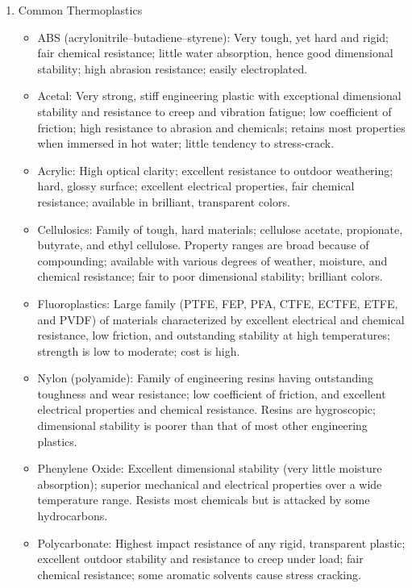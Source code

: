 \documentclass[a4paper,openany,12pt]{book}
\begin{document}
\begin{enumerate}
\item Common Thermoplastics
\label{common-thermoplastics}
\begin{itemize}
\item ABS (acrylonitrile--butadiene--styrene): Very tough, yet hard and
rigid; fair chemical resistance; little water absorption, hence good
dimensional stability; high abrasion resistance; easily electroplated.

\item Acetal: Very strong, stiff engineering plastic with exceptional
dimensional stability and resistance to creep and vibration fatigue;
low coefficient of friction; high resistance to abrasion and
chemicals; retains most properties when immersed in hot water; little
tendency to stress-crack.

\item Acrylic: High optical clarity; excellent resistance to outdoor
weathering; hard, glossy surface; excellent electrical properties,
fair chemical resistance; available in brilliant, transparent colors.

\item Cellulosics: Family of tough, hard materials; cellulose acetate,
propionate, butyrate, and ethyl cellulose. Property ranges are broad
because of compounding; available with various degrees of weather,
moisture, and chemical resistance; fair to poor dimensional stability;
brilliant colors.

\item Fluoroplastics: Large family (PTFE, FEP, PFA, CTFE, ECTFE, ETFE, and
PVDF) of materials characterized by excellent electrical and chemical
resistance, low friction, and outstanding stability at high
temperatures; strength is low to moderate; cost is high.

\item Nylon (polyamide): Family of engineering resins having outstanding
toughness and wear resistance; low coefficient of friction, and
excellent electrical properties and chemical resistance. Resins are
hygroscopic; dimensional stability is poorer than that of most other
engineering plastics.

\item Phenylene Oxide: Excellent dimensional stability (very little moisture
absorption); superior mechanical and electrical properties over a wide
temperature range. Resists most chemicals but is attacked by some
hydrocarbons.

\item Polycarbonate: Highest impact resistance of any rigid, transparent
plastic; excellent outdoor stability and resistance to creep under
load; fair chemical resistance; some aromatic solvents cause stress
cracking.


\end{itemize}
\end{enumerate}
\end{document}
